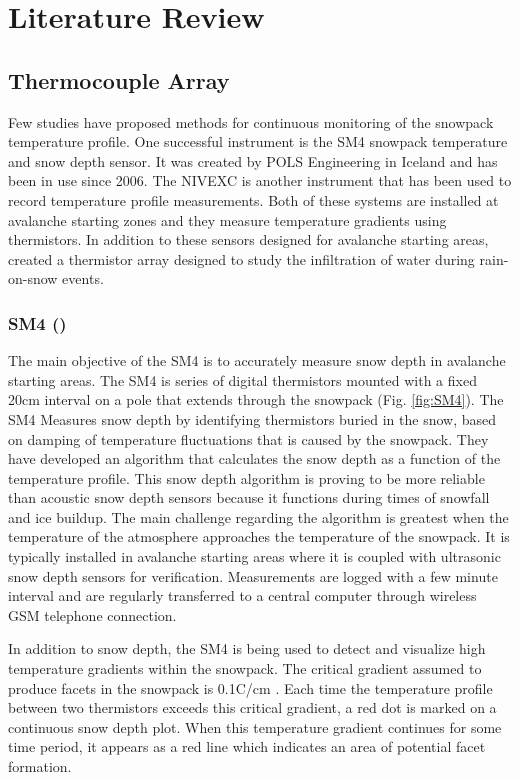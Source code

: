 \chapter{Literature Review}
\section{Thermocouple Array}
Few studies have proposed methods for continuous monitoring of the snowpack temperature profile. One successful instrument is the SM4 snowpack temperature and snow depth sensor. It was created by POLS Engineering in Iceland and has been in use since 2006. The NIVEXC is another instrument that has been used to record temperature profile measurements. Both of these systems are installed at avalanche starting zones and they measure temperature gradients using thermistors. In addition to these sensors designed for avalanche starting areas, \cite{conway_benedict_1994} created a thermistor array designed to study the infiltration of water during rain-on-snow events. 

\subsection{SM4 (\cite{ingolfsson2008sm4})}  The main objective of the SM4 is to accurately measure snow depth in avalanche starting areas. The SM4 is series of digital thermistors mounted with a fixed 20cm interval on a pole that extends through the snowpack (Fig. \ref{fig:SM4}). The SM4 Measures snow depth by identifying thermistors buried in the snow, based on damping of temperature fluctuations that is caused by the snowpack. They have developed an algorithm that calculates the snow depth as a function of the temperature profile. This snow depth algorithm is proving to be more reliable than acoustic snow depth sensors because it functions during times of snowfall and ice buildup. The main challenge regarding the algorithm is greatest when the temperature of the atmosphere approaches the temperature of the snowpack. It is typically installed in avalanche starting areas where it is coupled with ultrasonic snow depth sensors for verification. Measurements are logged with a few minute interval and are regularly transferred to a central computer through wireless GSM telephone connection.

In addition to snow depth, the SM4 is being used to detect and visualize high temperature gradients within the snowpack. The critical gradient assumed to produce facets in the snowpack is 0.1\textdegree C/cm \cite{mcclung_schaerer_2009}. Each time the temperature profile between two thermistors exceeds this critical gradient, a red dot is marked on a continuous snow depth plot. When this temperature gradient continues for some time period, it appears as a red line which indicates an area of potential facet formation. 


